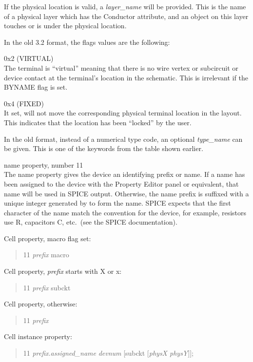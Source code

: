 \begin{description}
If the physical location is valid, a {\it layer\_name} will be provided. 
This is the name of a physical layer which has the {\et Conductor}
attribute, and an object on this layer touches or is under the
physical location.

In the old 3.2 format, the flags values are the following:
\begin{description}
\item{\vt 0x2} (VIRTUAL)\\
The terminal is ``virtual'' meaning that there is no wire vertex or
subcircuit or device contact at the terminal's location in the
schematic.  This is irrelevant if the BYNAME flag is set.

\item{\vt 0x4} (FIXED)\\
It set, {\Xic} will not move the corresponding physical terminal
location in the layout.  This indicates that the location has been
``locked'' by the user.
\end{description}

In the old format, instead of a numerical type code, an optional {\it
type\_name} can be given.  This is one of the keywords from the table
shown earlier.

\item{\et name} property, number 11\\
The {\et name} property gives the device an identifying prefix or
name.  If a name has been assigned to the device with the {\cb
Property Editor} panel or equivalent, that name will be used in SPICE
output.  Otherwise, the name prefix is suffixed with a unique integer
generated by {\Xic} to form the name.  SPICE expects that the first
character of the name match the convention for the device, for
example, resistors use R, capacitors C, etc.~(see the SPICE
documentation).

Cell property, {\vt macro} flag set:
\begin{quote}
{ 11} {\it prefix} {\vt macro}
\end{quote}
Cell property, {\it prefix} starts with {\vt X} or {\vt x}:
\begin{quote}
{ 11} {\it prefix} { subckt}
\end{quote}
Cell property, otherwise:
\begin{quote}
{ 11} {\it prefix}
\end{quote}

Cell instance property:
\begin{quote}
{ 11} {\it prefix\/}.{\it assigned\_name\/} {\it devnum}
[{\vt subckt} [{\it physX physY\/}]];
\end{quote}


\end{description}
